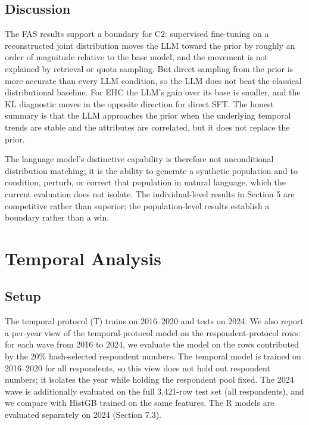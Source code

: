 \subsection{Discussion}\label{discussion-1}

The FAS results support a boundary for C2: supervised fine-tuning on a
reconstructed joint distribution moves the LLM toward the prior by
roughly an order of magnitude relative to the base model, and the
movement is not explained by retrieval or quota sampling. But direct
sampling from the prior is more accurate than every LLM condition, so
the LLM does not beat the classical distributional baseline. For EHC the
LLM's gain over its base is smaller, and the KL diagnostic moves in the
opposite direction for direct SFT. The honest summary is that the LLM
approaches the prior when the underlying temporal trends are stable and
the attributes are correlated, but it does not replace the prior.

The language model's distinctive capability is therefore not
unconditional distribution matching; it is the ability to generate a
synthetic population and to condition, perturb, or correct that
population in natural language, which the current evaluation does not
isolate. The individual-level results in Section 5 are competitive
rather than superior; the population-level results establish a boundary
rather than a win.

\section{Temporal Analysis}\label{temporal-analysis}

\subsection{Setup}\label{setup-2}

The temporal protocol (T) trains on 2016--2020 and tests on 2024. We
also report a per-year view of the temporal-protocol model on the
respondent-protocol rows: for each wave from 2016 to 2024, we evaluate
the model on the rows contributed by the 20\% hash-selected respondent
numbers. The temporal model is trained on 2016--2020 for all
respondents, so this view does not hold out respondent numbers; it
isolates the year while holding the respondent pool fixed. The 2024 wave
is additionally evaluated on the full 3,421-row test set (all
respondents), and we compare with HistGB trained on the same features.
The R models are evaluated separately on 2024 (Section 7.3).


